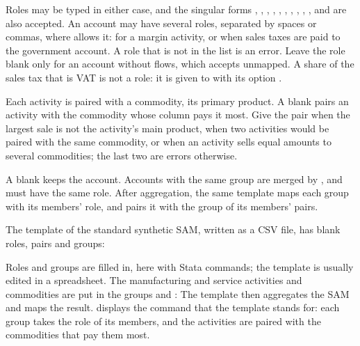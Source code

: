 Roles may be typed in either case, and the singular forms ,
, , , ,
, , ,
, ,  and  are also
accepted. An account may have several roles, separated by spaces or commas, where
 allows it:  for a margin activity, or
 when sales taxes are paid to the government account.
A role that is not in the list is an error. Leave the role blank only for an
account without flows, which  accepts unmapped. A share of the
sales tax that is VAT is not a role: it is given to  with
its option .


Each activity is paired with a commodity, its primary product. A blank
 pairs an activity with the commodity whose column pays it most. Give
the pair when the largest sale is not the activity's main product, when two
activities would be paired with the same commodity, or when an activity sells
equal amounts to several commodities; the last two are errors otherwise.


A blank  keeps the account. Accounts with the same group are merged
by , and must have the same role. After aggregation,
 the same template maps each group with its members' role,
and pairs it with the group of its members' pairs.


The template of the standard synthetic SAM, written as a CSV file, has blank
roles, pairs and groups:


Roles and groups are filled in, here with Stata commands; the template is
usually edited in a spreadsheet. The manufacturing and service activities and
commodities are put in the groups  and :
The template then aggregates the SAM and maps the result. 
displays the command that the template stands for: each group takes the role of
its members, and the activities are paired with the commodities that pay them
most.


